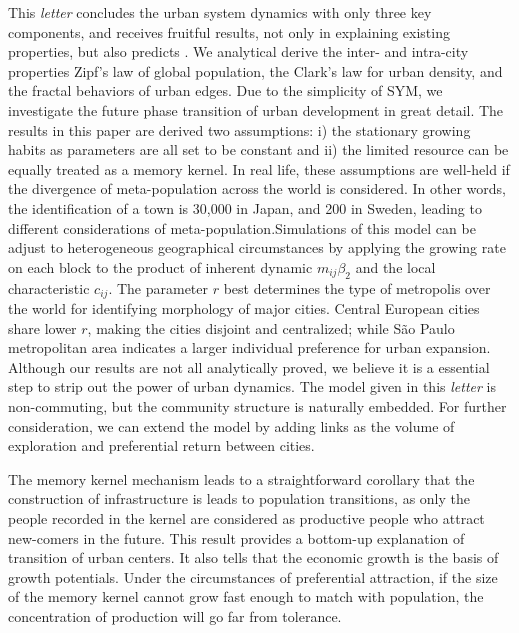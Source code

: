 \documentclass[reprint,unsortedaddress,amsmath,amssymb,floatfix,aps,prl,showkeys]{revtex4-2}
\begin{document}

This \emph{letter} concludes the urban system dynamics with only three key components, and receives fruitful results, not only in explaining existing properties, but also predicts . We analytical derive the inter- and intra-city properties Zipf's law of global population, the Clark's law for urban density, and the fractal behaviors of urban edges. Due to the simplicity of SYM, we investigate the future phase transition of urban development in great detail. The results in this paper are derived two assumptions: i) the stationary growing habits as parameters are all set to be constant and ii) the limited resource can be equally treated as a memory kernel. In real life, these assumptions are well-held if the divergence of meta-population across the world is considered. In other words, the identification of a town is 30,000 in Japan, and 200 in Sweden, leading to different considerations of meta-population.Simulations of this model can be adjust to heterogeneous geographical circumstances by applying the growing rate on each block to the product of inherent dynamic $m_{ij}\beta_2$ and the local characteristic $c_{ij}$. The parameter $r$ best determines the type of metropolis over the world for identifying morphology of major cities. Central European cities share lower $r$, making the cities disjoint and centralized; while São Paulo metropolitan area indicates a larger individual preference for urban expansion. Although our results are not all analytically proved, we believe it is a essential step to strip out the power of urban dynamics. The model given in this \emph{letter} is non-commuting, but the community structure is naturally embedded. For further consideration, we can extend the model by adding links as the volume of exploration and preferential return between cities\cite{WANG2019121921}.

The memory kernel mechanism leads to a straightforward corollary that the construction of infrastructure is leads to population transitions, as only the people recorded in the kernel are considered as productive people who attract new-comers in the future. This result provides a bottom-up explanation of transition of urban centers. It also tells that the economic growth is the basis of growth potentials. Under the circumstances of preferential attraction, if the size of the memory kernel cannot grow fast enough to match with population, the concentration of production will go far from tolerance.


\end{document}
